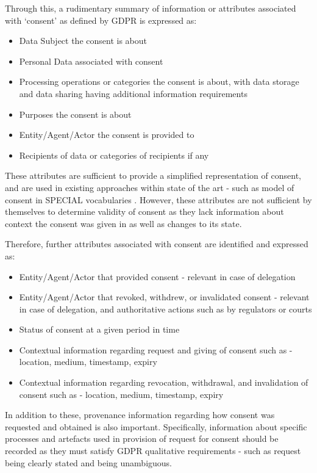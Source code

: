 Through this, a rudimentary summary of information or attributes associated with `consent' as defined by GDPR is expressed as:
\begin{itemize}
    \item Data Subject the consent is about
    \item Personal Data associated with consent
    \item Processing operations or categories the consent is about, with data storage and data sharing having additional information requirements
    \item Purposes the consent is about
    \item Entity/Agent/Actor the consent is provided to
    \item Recipients of data or categories of recipients if any
\end{itemize}
These attributes are sufficient to provide a simplified representation of consent, and are used in existing approaches within state of the art - such as model of consent in SPECIAL vocabularies \cite{bonatti_special_2018}. However, these attributes are not sufficient by themselves to determine validity of consent as they lack information about context the consent was given in as well as changes to its state.

Therefore, further attributes associated with consent are identified and expressed as:
\begin{itemize}
    \item Entity/Agent/Actor that provided consent - relevant in case of delegation
    \item Entity/Agent/Actor that revoked, withdrew, or invalidated consent - relevant in case of delegation, and authoritative actions such as by regulators or courts
    \item Status of consent at a given period in time
    \item Contextual information regarding request and giving of consent such as - location, medium, timestamp, expiry
    \item Contextual information regarding revocation, withdrawal, and invalidation of consent such as - location, medium, timestamp, expiry
\end{itemize}
In addition to these, provenance information regarding how consent was requested and obtained is also important.
Specifically, information about specific processes and artefacts used in provision of request for consent should be recorded as they must satisfy GDPR qualitative requirements - such as request being clearly stated and being unambiguous.

